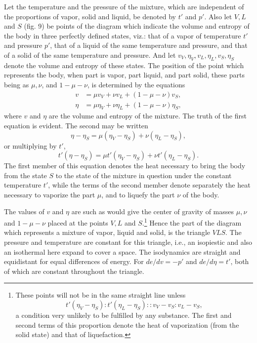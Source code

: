 \documentclass[11pt]{article}
\begin{document}
Let the temperature and the pressure of the mixture, which are independent of the proportions of vapor, solid and liquid, be denoted by $t'$ and $p'$. Also let $V,L$ and $S$ (fig. 9) be points of the diagram which indicate the volume and entropy of the body in three perfectly defined states, viz.: that of a vapor of temperature $t'$ and pressure $p'$, that of a liquid of the same temperature and pressure, and that of a solid of the same temperature and pressure. And let $v_V,\eta_V,v_L,\eta_L,v_S,\eta_S$ denote the volume and entropy of these states. The position of the point which represents the body, when part is vapor, part liquid, and part solid, these parts being as $\mu,\nu$, and $1-\mu-\nu$, is determined by the equations
\begin{align*}
v&=\mu v_V+\nu v_L+(1-\mu-\nu)v_S,\\
\eta&=\mu\eta_V+\nu\eta_L+(1-\mu-\nu)\eta_S,
\end{align*}
where $v$ and $\eta$ are the volume and entropy of the mixture. The truth of the first equation is evident. The second may be written
\[
\eta-\eta_S=\mu(\eta_V-\eta_S)+\nu(\eta_L-\eta_S),
\]
or multiplying by $t'$,
\[
t'(\eta-\eta_S)=\mu t'(\eta_V-\eta_S)+\nu t'(\eta_L-\eta_S).
\]
The first member of this equation denotes the heat necessary to bring the body from the state $S$ to the state of the mixture in question under the constant temperature $t'$, while the terms of the second member denote separately the heat necessary to vaporize the part $\mu$, and to liquefy the part $\nu$ of the body.

\begin{figure}[h]
\centering
{}
\end{figure}

The values of $v$ and $\eta$ are such as would give the center of gravity of masses $\mu,\nu$ and $1-\mu-\nu$ placed at the points $V,L$ and $S$.\footnote{These points will not be in the same straight line unless
\[
t'(\eta_V-\eta_S):t'(\eta_L-\eta_S)::v_V-v_S:v_L-v_S,
\]
a condition very unlikely to be fulfilled by any substance. The first and second terms of this proportion denote the heat of vaporization (from the solid state) and that of liquefaction.} Hence the part of the diagram which represents a mixture of vapor, liquid and solid, is the triangle $VLS$. The pressure and temperature are constant for this triangle, i.e., an isopiestic and also an isothermal here expand to cover a space. The isodynamics are straight and equidistant for equal differences of energy. For $de/dv=-p'$ and $de/d\eta=t'$, both of which are constant throughout the triangle.
\end{document}
